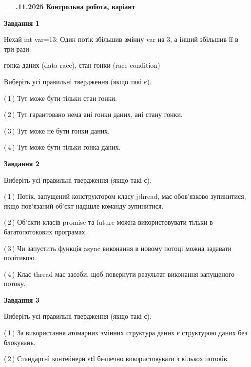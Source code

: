 \documentclass[12pt, ukrainian]{article}
\begin{document}
\begin {large}

\textbf{\_\_.11.2025 Контрольна робота, варіант  }\par


{

\begin{center}
\textbf{Завдання 1}
\end{center}
Нехай int var=13; Один потік збільшив змінну var на 3, а інший збільшив її в три рази.

гонка даних (data race), стан гонки (race condition)

Виберіть усі правильні твердження (якщо такі є).\par
\vspace{2mm}
(\,1\,) Тут може бути тільки стан гонки.%

(\,2\,) Тут гарантовано нема ані гонки даних, ані стану гонки.%

(\,3\,) Тут може не бути гонки даних.%

(\,4\,) Тут може бути тільки гонка даних.%



\begin{center}
\textbf{Завдання 2}
\end{center}
Виберіть усі правильні твердження (якщо такі є).\par
\vspace{2mm}

(\,1\,) Потік, запущений конструктором класу jthread, має обов’язково зупинитися, якщо пов’язаний об’єкт надішле команду зупинитися.%

(\,2\,) Об’єкти класів promise та future можна використовувати тільки в багатопотокових програмах.%

(\,3\,) Чи запустить функція  async виконання в новому потоці можна задавати політикою.%

(\,4\,) Клас thread має засоби, щоб повернути результат виконання запущеного потоку.%



\begin{center}
\textbf{Завдання 3}
\end{center}
Виберіть усі правильні твердження (якщо такі є).\par


(\,1\,) За використання атомарних змінних структура даних є структурою даних без блокувань.%

(\,2\,) Стандартні контейнери stl безпечно використовувати з кількох потоків.%

}
\end{large}
\end{document}
